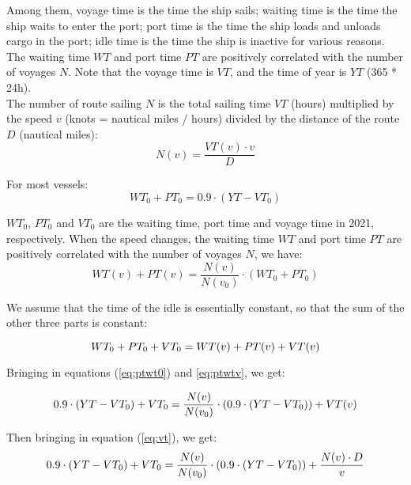 \documentclass[a4paper,12pt]{article}
\begin{document}
Among them, voyage time is the time the ship sails; waiting time is the time the ship waits to enter the port; port time is the time the ship loads and unloads cargo in the port; idle time is the time the ship is inactive for various reasons.
The waiting time $WT$ and port time $PT$ are positively correlated with the number of voyages $N$.
Note that the voyage time is $VT$, and the time of year is $YT$ (365 * 24h). \\

The number of route sailing $N$ is the total sailing time $VT$ (hours) multiplied by the speed $v$ (knots = nautical miles / hours) divided by the distance of the route $D$ (nautical miles):
\begin{equation}
	\label{eq:vt}
	N(v) = \frac{VT(v) \cdot v }{D}
\end{equation}

For most vessels:
\begin{equation}
	\label{eq:ptwt0}
	WT_0+PT_0 = 0.9 \cdot (YT-VT_0)
\end{equation}

$WT_0$, $PT_0$ and $VT_0$ are the waiting time, port time and voyage time in 2021, respectively.
When the speed changes, the waiting time $WT$ and port time $PT$ are positively correlated with the number of voyages $N$, we have:
\begin{equation}
	\label{eq:ptwtv}
	WT(v)+PT(v) = \frac{N(v)}{N(v_0)} \cdot (WT_0 + PT_0)
\end{equation}

We assume that the time of the idle is essentially constant, so that the sum of the other three parts is constant:

\begin{equation}
	\label{eq:constant_sum1}
	WT_0+PT_0+VT_0 = WT(v)+PT(v)+VT(v)\\
\end{equation}

Bringing in equations (\ref{eq:ptwt0}) and \ref{eq:ptwtv}, we get:

\begin{equation}
	\label{eq:constant_sum2}
	0.9 \cdot (YT-VT_0)+VT_0 = \frac{N(v)}{N(v_0)} \cdot (0.9 \cdot (YT-VT_0))+VT(v)\\
\end{equation}

Then bringing in equation (\ref{eq:vt}), we get:
\begin{equation}
	\label{eq:nv0}
	0.9 \cdot (YT-VT_0)+VT_0 = \frac{N(v)}{N(v_0)} \cdot (0.9 \cdot (YT-VT_0))+\frac{N(v) \cdot D}{v}\\
\end{equation}
\end{document}
